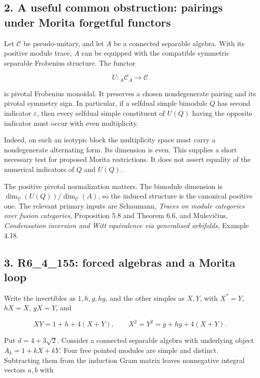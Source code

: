 \documentclass[
  11pt,
]{article}
\begin{document}
\hypertarget{a-useful-common-obstruction-pairings-under-morita-forgetful-functors}{%
\subsection{2. A useful common obstruction: pairings under Morita
forgetful
functors}\label{a-useful-common-obstruction-pairings-under-morita-forgetful-functors}}

Let \(\mathcal C\) be pseudo-unitary, and let \(A\) be a connected
separable algebra. With its positive module trace, \(A\) can be equipped
with the compatible symmetric separable Frobenius structure. The functor

\[
U:{}_A\mathcal C_A\longrightarrow\mathcal C
\]

is pivotal Frobenius monoidal. It preserves a chosen nondegenerate
pairing and its pivotal symmetry sign. In particular, if a selfdual
simple bimodule \(Q\) has second indicator \(\varepsilon\), then every
selfdual simple constituent of \(U(Q)\) having the opposite indicator
must occur with even multiplicity.

Indeed, on such an isotypic block the multiplicity space must carry a
nondegenerate alternating form. Its dimension is even. This supplies a
short necessary test for proposed Morita restrictions. It does not
assert equality of the numerical indicators of \(Q\) and \(U(Q)\).

The positive pivotal normalization matters. The bimodule dimension is
\(\dim_{\mathcal C}(U(Q))/\dim_{\mathcal C}(A)\), so the induced
structure is the canonical positive one. The relevant primary inputs are
Schaumann, \emph{Traces on module categories over fusion categories},
Proposition 5.8 and Theorem 6.6, and Mulevičius, \emph{Condensation
inversion and Witt equivalence via generalised orbifolds}, Example 4.18.

\hypertarget{r6_4_155-forced-algebras-and-a-morita-loop}{%
\subsection{3. R6\_4\_155: forced algebras and a Morita
loop}\label{r6_4_155-forced-algebras-and-a-morita-loop}}

Write the invertibles as \(1,h,g,hg\), and the other simples as \(X,Y\),
with \(X^*=Y\), \(hX=X\), \(gX=Y\), and

\[
XY=1+h+4(X+Y),\qquad X^2=Y^2=g+hg+4(X+Y).
\]

Put \(d=4+3\sqrt2\). Consider a connected separable algebra with
underlying object \(A_k=1+kX+kY\). Four free pointed modules are simple
and distinct. Subtracting them from the induction Gram matrix leaves
nonnegative integral vectors \(a,b\) with
\end{document}
